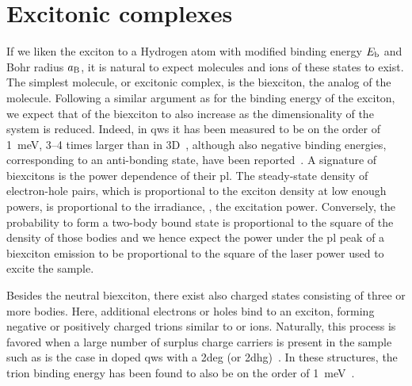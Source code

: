 \section{Excitonic complexes}\label{sec:exp:theory:complexes}
If we liken the exciton to a Hydrogen atom with modified binding energy $E_{\mathrm{b}}$ and Bohr radius $a_{\mathrm{B}}$, it is natural to expect molecules and ions of these states to exist.
The simplest molecule, or excitonic complex, is the biexciton, the analog of the  molecule.
Following a similar argument as for the binding energy of the exciton, we expect that of the biexciton to also increase as the dimensionality of the system is reduced.
Indeed, in \glspl{qw} it has been measured to be on the order of \qty{1}{\milli\electronvolt}, \numrange{3}{4} times larger than in 3D~\cite{Miller1985a}, although also negative binding energies, corresponding to an anti-bonding state, have been reported~\cite{Kako2004,Dialynas2008,Amloy2011}.
A signature of biexcitons is the power dependence of their \gls{pl}.
The steady-state density of electron-hole pairs, which is proportional to the exciton density at low enough powers, is proportional to the irradiance, \ie, the excitation power.
Conversely, the probability to form a two-body bound state is proportional to the square of the density of those bodies and we hence expect the power under the \gls{pl} peak of a biexciton emission to be proportional to the square of the laser power used to excite the sample.

Besides the neutral biexciton, there exist also charged states consisting of three or more bodies.
Here, additional electrons or holes bind to an exciton, forming negative or positively charged trions similar to  or  ions.
Naturally, this process is favored when a large number of surplus charge carriers is present in the sample such as is the case in doped \glspl{qw} with a \gls{2deg} (or \gls{2dhg})~\cite{Finkelstein1995}.
In these structures, the trion binding energy has been found to also be on the order of \qty{1}{\milli\electronvolt}~\cite{Esser2000,Bar-Joseph2005}.